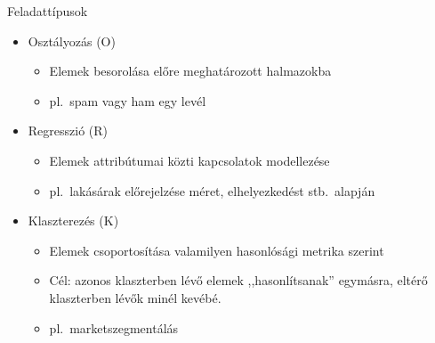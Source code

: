 \documentclass[bigger]{beamer}
\begin{document}
\begin{frame}{Feladattípusok}
    \begin{itemize}
        \item Osztályozás (O) 
            \begin{itemize}
                \item Elemek besorolása előre meghatározott halmazokba
                \item pl.~spam vagy ham egy levél
            \end{itemize}
        \item Regresszió (R) 
            \begin{itemize}
                \item Elemek attribútumai közti kapcsolatok modellezése
                \item pl.~lakásárak előrejelzése méret, elhelyezkedést stb.~alapján
            \end{itemize}
        \item Klaszterezés (K) 
            \begin{itemize}
                \item Elemek csoportosítása valamilyen hasonlósági metrika szerint
                \item Cél: azonos klaszterben lévő elemek ,,hasonlítsanak'' egymásra, eltérő klaszterben lévők minél kevébé.
                \item pl.~marketszegmentálás
            \end{itemize}
    \end{itemize}
\end{frame}

\end{document}
